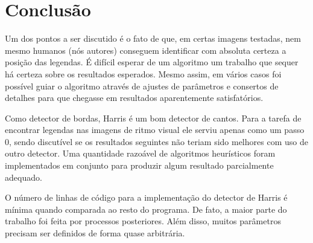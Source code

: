 \documentclass[12pt]{article}
\begin{document}
\section{Conclusão}

Um  dos pontos a  ser discutido  é o  fato de  que, em  certas imagens
testadas, nem  mesmo humanos  (nós autores) conseguem  identificar com
absoluta  certeza a  posição das  legendas.  É difícil  esperar de  um
algoritmo  um  trabalho que  sequer  há  certeza  sobre os  resultados
esperados. Mesmo assim, em vários casos foi possível guiar o algoritmo
através  de ajustes  de parâmetros  e consertos  de detalhes  para que
chegasse em resultados aparentemente satisfatórios.

Como detector de bordas, Harris é um bom detector de cantos. %
Para a  tarefa de encontrar legendas  nas imagens de  ritmo visual ele
serviu  apenas como  um passo  0,  sendo discutível  se os  resultados
seguintes não  teriam sido  melhores com uso  de outro  detector.  Uma
quantidade razoável  de algoritmos heurísticos  foram implementados em
conjunto para produzir algum resultado parcialmente adequado.

O  número de  linhas de  código para  a implementação  do  detector de
Harris  é mínima quando  comparada ao  resto do  programa. De  fato, a
maior parte do trabalho foi feita por processos posteriores.
Além  disso,  muitos  parâmetros   precisam  ser  definidos  de  forma
quase arbitrária.




\end{document}
